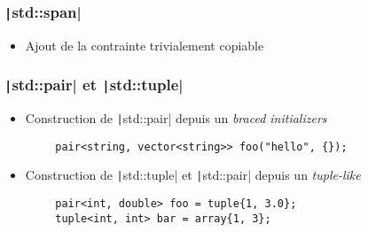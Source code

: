 \documentclass[C++.tex]{subfiles}
\begin{document}
\begin{frame}[fragile]
\end{frame}

\begin{frame}[fragile]
	\frametitle{\texttt|std::span|}
	\begin{itemize}
		\item Ajout de la contrainte trivialement copiable
	\end{itemize}

\end{frame}

\begin{frame}[fragile]
	\frametitle{\texttt|std::pair| et \texttt|std::tuple|}
	\begin{itemize}
		\item Construction de \texttt|std::pair| depuis un \textit{braced initializers}

	\end{itemize}

	\begin{verbatim}
		pair<string, vector<string>> foo("hello", {});
	\end{verbatim}

	\begin{itemize}
		\item Construction de \texttt|std::tuple| et \texttt|std::pair| depuis un \textit{tuple-like}
	\end{itemize}

	\begin{verbatim}
		pair<int, double> foo = tuple{1, 3.0};
		tuple<int, int> bar = array{1, 3};
	\end{verbatim}



\end{frame}
\end{document}
